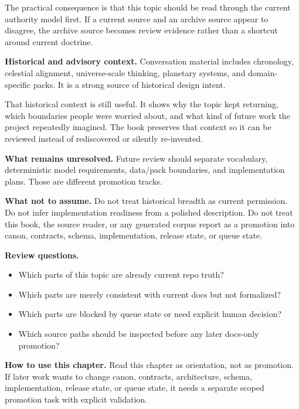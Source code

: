 \documentclass[10.5pt,a4paper,openany]{book}
\begin{document}
The practical consequence is that this topic should be read through the current authority model first.\allowbreak{} If a current source and an archive source appear to disagree, the archive source becomes review evidence rather than a shortcut around current doctrine.\allowbreak{}


\textbf{Historical and advisory context.} Conversation material includes chronology, celestial alignment, universe-\allowbreak{}scale thinking, planetary systems, and domain-\allowbreak{}specific packs.\allowbreak{} It is a strong source of historical design intent.\allowbreak{}


That historical context is still useful.\allowbreak{} It shows why the topic kept returning, which boundaries people were worried about, and what kind of future work the project repeatedly imagined.\allowbreak{} The book preserves that context so it can be reviewed instead of rediscovered or silently re-\allowbreak{}invented.\allowbreak{}


\textbf{What remains unresolved.} Future review should separate vocabulary, deterministic model requirements, data/\allowbreak{}pack boundaries, and implementation plans.\allowbreak{} Those are different promotion tracks.\allowbreak{}


\textbf{What not to assume.} Do not treat historical breadth as current permission.\allowbreak{} Do not infer implementation readiness from a polished description.\allowbreak{} Do not treat this book, the source reader, or any generated corpus report as a promotion into canon, contracts, schema, implementation, release state, or queue state.\allowbreak{}


\textbf{Review questions.}


\begin{itemize}
\item Which parts of this topic are already current repo truth?
\item Which parts are merely consistent with current docs but not formalized?
\item Which parts are blocked by queue state or need explicit human decision?
\item Which source paths should be inspected before any later docs-\allowbreak{}only promotion?
\end{itemize}

\textbf{How to use this chapter.} Read this chapter as orientation, not as promotion.\allowbreak{} If later work wants to change canon, contracts, architecture, schema, implementation, release state, or queue state, it needs a separate scoped promotion task with explicit validation.\allowbreak{}
\end{document}
